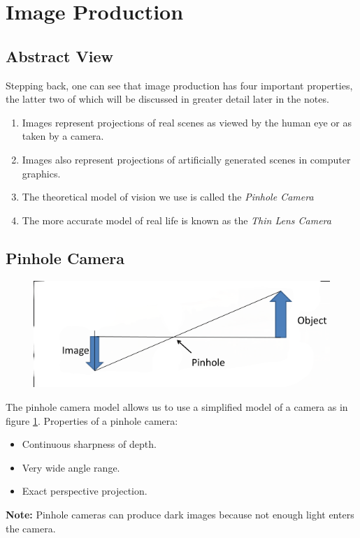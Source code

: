 \documentclass{article}
\begin{document}
\section{Image Production}
\subsection{Abstract View}
Stepping back, one can see that image production has four important properties, the latter two of which will be discussed in greater detail later in the notes.
\begin{enumerate}
	\item Images represent projections of real scenes as viewed by the human eye or as taken by a camera.
	\item Images also represent projections of artificially generated scenes in computer graphics.
	\item The theoretical model of vision we use is called the {\it Pinhole Camera}
	\item The more accurate model of real life is known as the {\it Thin Lens Camera}
\end{enumerate}
\subsection{Pinhole Camera}

\begin{figure}[h]
	\includegraphics[width=\textwidth]{pinhole.png}
	\label{fig:pinhole}
\end{figure}
The pinhole camera model allows us to use a simplified model of a camera as in figure \ref{fig:pinhole}.
Properties of a pinhole camera:
\begin{itemize}
	\item Continuous sharpness of depth.
	\item Very wide angle range.
	\item Exact perspective projection.
\end{itemize}
{\bf Note:} Pinhole cameras can produce dark images because not enough light enters the camera.
\end{document}

